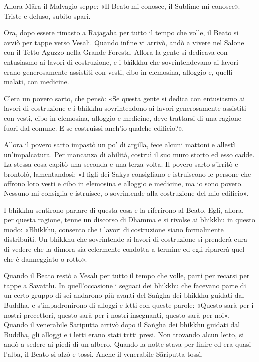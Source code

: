 Allora Māra il Malvagio seppe: «Il Beato mi conosce, il Sublime mi
conosce». Triste e deluso, subito sparì.




 Ora, dopo essere rimasto a Rājagaha per tutto il tempo che
volle, il Beato si avviò per tappe verso Vesālī. Quando infine vi
arrivò, andò a vivere nel Salone con il Tetto Aguzzo nella Grande
Foresta. Allora la gente si dedicava con entusiasmo ai lavori di
costruzione, e i bhikkhu che sovrintendevano ai lavori erano
generosamente assistiti con vesti, cibo in elemosina, alloggio e, quelli
malati, con medicine.


C’era un povero sarto, che pensò: «Se questa gente si dedica con
entusiasmo ai lavori di costruzione e i bhikkhu sovrintendono ai lavori
generosamente assistiti con vesti, cibo in elemosina, alloggio e
medicine, deve trattarsi di una ragione fuori dal comune. E se
costruissi anch’io qualche edificio?».


Allora il povero sarto impastò un po’ di argilla, fece alcuni mattoni e
allestì un’impalcatura. Per mancanza di abilità, costruì il suo muro
storto ed esso cadde. La stessa cosa capitò una seconda e una terza
volta. Il povero sarto s’irritò e brontolò, lamentandosi: «I figli dei
Sakya consigliano e istruiscono le persone che offrono loro vesti e cibo
in elemosina e alloggio e medicine, ma io sono povero. Nessuno mi
consiglia e istruisce, o sovrintende alla costruzione del mio edificio».


I bhikkhu sentirono parlare di questa cosa e la riferirono al Beato.
Egli, allora, per questa ragione, tenne un discorso di Dhamma e si
rivolse ai bhikkhu in questo modo: «Bhikkhu, consento che i lavori di
costruzione siano formalmente distribuiti. Un bhikkhu che sovrintende ai
lavori di costruzione si prenderà cura di vedere che la dimora sia
celermente condotta a termine ed egli riparerà quel che è danneggiato o
rotto».


Quando il Beato restò a Vesālī per tutto il tempo che volle, partì per
recarsi per tappe a Sāvatthī. In quell’occasione i seguaci dei bhikkhu
che facevano parte di un certo gruppo di sei andarono più avanti del
Saṅgha dei bhikkhu guidati dal Buddha, e s’impadronirono di alloggi e
letti con queste parole: «Questo sarà per i nostri precettori, questo
sarà per i nostri insegnanti, questo sarà per noi». Quando il venerabile
Sāriputta arrivò dopo il Saṅgha dei bhikkhu guidati dal Buddha, gli
alloggi e i letti erano stati tutti presi. Non trovando alcun letto, si
andò a sedere ai piedi di un albero. Quando la notte stava per finire ed
era quasi l’alba, il Beato si alzò e tossì. Anche il venerabile
Sāriputta tossì.


